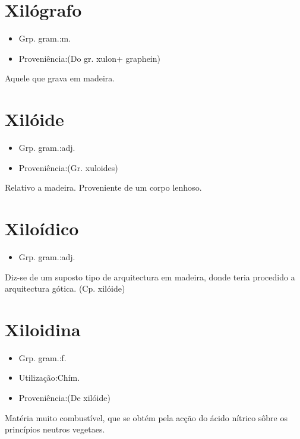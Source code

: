 \section{Xilógrafo}
\begin{itemize}
\item {Grp. gram.:m.}
\end{itemize}
\begin{itemize}
\item {Proveniência:(Do gr. \textunderscore xulon\textunderscore  + \textunderscore graphein\textunderscore )}
\end{itemize}
Aquele que grava em madeira.
\section{Xilóide}
\begin{itemize}
\item {Grp. gram.:adj.}
\end{itemize}
\begin{itemize}
\item {Proveniência:(Gr. \textunderscore xuloides\textunderscore )}
\end{itemize}
Relativo a madeira.
Proveniente de um corpo lenhoso.
\section{Xiloídico}
\begin{itemize}
\item {Grp. gram.:adj.}
\end{itemize}
Diz-se de um suposto tipo de arquitectura em madeira, donde teria procedido a arquitectura gótica.
(Cp. \textunderscore xilóide\textunderscore )
\section{Xiloidina}
\begin{itemize}
\item {Grp. gram.:f.}
\end{itemize}
\begin{itemize}
\item {Utilização:Chím.}
\end{itemize}
\begin{itemize}
\item {Proveniência:(De \textunderscore xilóide\textunderscore )}
\end{itemize}
Matéria muito combustível, que se obtém pela acção do ácido nítrico sôbre os princípios neutros vegetaes.
